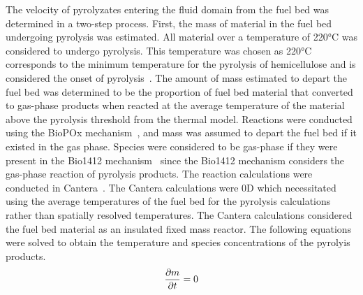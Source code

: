     The velocity of pyrolyzates entering the fluid domain from the fuel bed was determined in a two-step process. First, the mass of material in the fuel bed undergoing pyrolysis was estimated. All material over a temperature of 220\si{\celsius} was considered to undergo pyrolysis. This temperature was chosen as 220\si{\celsius} corresponds to the minimum temperature for the pyrolysis of hemicellulose and is considered the onset of pyrolysis~\cite{Yang2007a}. The amount of mass estimated to depart the fuel bed was determined to be the proportion of fuel bed material that converted to gas-phase products when reacted at the average temperature of the material above the pyrolysis threshold from the thermal model. Reactions were conducted using the BioPOx mechanism~\cite{Dhahak2019}, and mass was assumed to depart the fuel bed if it existed in the gas phase. Species were considered to be gas-phase if they were present in the Bio1412 mechanism~\cite{Ranzi2001, Ranzi2008} since the Bio1412 mechanism considers the gas-phase reaction of pyrolysis products. The reaction calculations were conducted in Cantera~\cite{Goodwin2020}. The Cantera calculations were 0D which necessitated using the average temperatures of the fuel bed for the pyrolysis calculations rather than spatially resolved temperatures. The Cantera calculations considered the fuel bed material as an insulated fixed mass reactor. The following equations were solved to obtain the temperature and species concentrations of the pyrolyis products. 
        \begin{equation}
            \pder[m]{t} = 0
        \end{equation}
        
